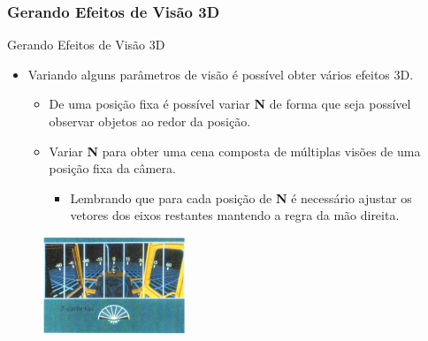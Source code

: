 \documentclass{beamer}
\begin{document}
\begin{frame}
\frametitle{Gerando Efeitos de Visão 3D}
	\begin{block}{Gerando Efeitos de Visão 3D}
		\begin{itemize}
			\item Variando alguns parâmetros de visão é possível obter vários efeitos 3D.
				\begin{itemize}
					\item De uma posição fixa é possível variar \textbf{N} de forma que seja possível observar objetos ao redor da posição.
					\item Variar \textbf{N} para obter uma cena composta de múltiplas visões de uma posição fixa da câmera.
					\begin{itemize}
						\item Lembrando que para cada posição de \textbf{N} é necessário ajustar os vetores dos eixos restantes mantendo a regra da mão direita.
					\end{itemize}
				\end{itemize}
		\end{itemize}
	\end{block}
	
	\begin{figure}[!h]
			\begin{center}
			\includegraphics[width=0.38\textwidth]{Figures/MulN}
			\end{center}
	\end{figure}
\end{frame}
\end{document}
